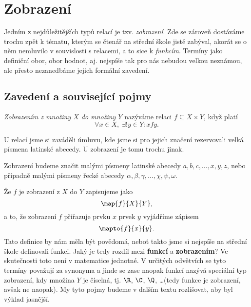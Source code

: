 \section{Zobrazení}\label{sec:zobrazeni}
Jedním z nejdůležitějších typů relací je tzv. \emph{zobrazení}. Zde se zároveň dostáváme trochu zpět k tématu, kterým se čtenář na střední škole jistě zabýval, akorát se o něm nemluvilo v souvislosti s relacemi, a to sice k \emph{funkcím}. Termíny jako definiční obor, obor hodnot, aj. nejspíše tak pro nás nebudou velkou neznámou, ale přesto nezanedbáme jejich formální zavedení.

\subsection{Zavedení a související pojmy}
\begin{definition}[Zobrazení]\label{def:zobrazeni}
    \emph{Zobrazením z množiny $X$ do množiny $Y$} nazýváme relaci $f\subseteq X\times Y$, když platí
    \begin{equation*}
        \forall x\in X,\; \exists! y\in Y: xfy.
    \end{equation*}
\end{definition}
U relací jsme si zaváděli úmluvu, kde jsme si pro jejich značení rezervovali velká písmena latinské abecedy. U zobrazení je tomu trochu jinak.
\begin{convention}
    \sloppy Zobrazení budeme značit malými písmeny latinské abecedy $a,b,c,\dots,x,y,z$, nebo případně malými písmeny řecké abecedy $\alpha,\beta,\gamma,\dots,\chi,\psi,\omega$.
\end{convention}
Že $f$ je zobrazení z $X$ do $Y$ zapisujeme jako
\begin{equation*}
    \map{f}{X}{Y},
\end{equation*}
a to, že zobrazení $f$ přiřazuje prvku $x$ prvek $y$ vyjádříme zápisem
\begin{equation*}
    \mapto{f}{x}{y}.
\end{equation*}
Tato definice by nám měla být povědomá, neboť takto jsme si nejspíše na střední škole definovali funkci. Jaký je tedy rozdíl mezi \textbf{funkcí} a \textbf{zobrazením}? Ve skutečnosti toto není v matematice jednotné. V určitých odvětvích se tyto termíny považují za synonyma a jinde se zase naopak funkcí nazývá speciální typ zobrazení, kdy množina $Y$ je číselná, tj. $\R$, $\C$, $\Q$, \dots (tedy funkce je zobrazení, avšak ne naopak). My tyto pojmy budeme v dalším textu rozlišovat, aby byl výklad jasnější.\par
